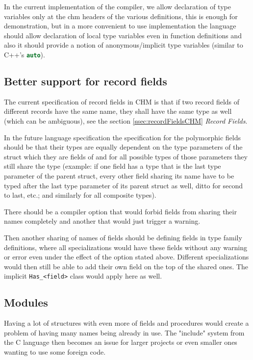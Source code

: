 In the current implementation of the compiler, we allow declaration of type variables only at the chm headers of the various definitions, this is enough for demonstration, but in a more convenient to use implementation the language should allow declaration of local type variables even in function definitions and also it should provide a notion of anonymous/implicit type variables (similar to C++'s \lstinline[language=c++]{auto}).

\subsection{Better support for record fields}

The current specification of record fields in CHM is that if two record fields of different records have the same name, they shall have the same type as well (which can be ambiguous), see the section \ref{ssec:recordFieldsCHM} \emph{Record Fields}.

In the future language specification the specification for the polymorphic fields should be that their types are equally dependent on the type parameters of the struct which they are fields of and for all possible types of those parameters they still share the type (example: if one field has a type that is the last type parameter of the parent struct, every other field sharing its name have to be typed after the last type parameter of its parent struct as well, ditto for second to last, etc.; and similarly for all composite types).

There should be a compiler option that would forbid fields from sharing their names completely and another that would just trigger a warning.

Then another sharing of names of fields should be defining fields in type family definitions, where all specializations would have these fields without any warning or error even under the effect of the option stated above. Different specializations would then still be able to add their own field on the top of the shared ones. The implicit \lstinline{Has_<field>} class would apply here as well.

\subsection{Modules}

Having a lot of structures with even more of fields and procedures would create a problem of having many names being already in use. The "include" system from the C language then becomes an issue for larger projects or even smaller ones wanting to use some foreign code.

